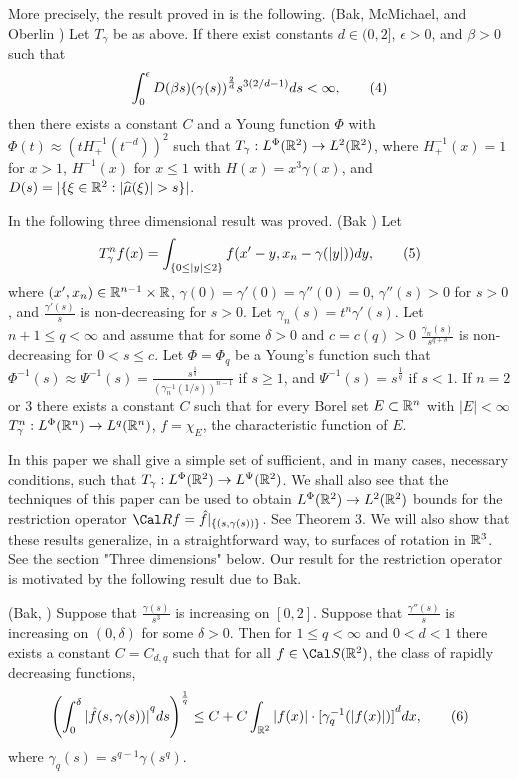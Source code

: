 More precisely, the result proved in \cite{BMO91} is the following. 
 (Bak, McMichael, and Oberlin \cite{BMO91}) Let 
$T_{\gamma}$ be as above. If there exist constants $d \in (0,2]$, 
$\epsilon>0$, and $\beta>0$ such that 
$$ \int_{0}^{\epsilon} D(\beta s) {(\gamma(s))}^{\frac{2}{d}} 
s^{3(2/d-1)} ds<\infty, \tag4$$ then there exists a constant $C$ and 
a Young function $\Phi$ with $\Phi(t) \approx {(tH_{+}^{-1}(t^{-d}))}^2$ 
such that $T_{\gamma}: L^{\Phi}({\Bbb R}^2) \rightarrow L^2({\Bbb R}^2)$,
where $H_{+}^{-1}(x)=1$ for $x>1$, $H^{-1}(x)$ for $x \leq 1$ with 
$H(x)=x^3\gamma(x)$, and $D(s)=|\{ \xi \in {\Bbb R}^2: |\widehat{\mu}(\xi)| 
>s \}|$. \endproclaim 

In \cite{Bak94} the following three dimensional result was proved. 
 (Bak \cite{Bak94}) Let 
$$ T^n_{\gamma}f(x)=\int_{\{0 \leq |y| \leq 2\}} f(x'-y, x_n-\gamma(|y|))dy, 
\tag5$$ where $(x',x_n) \in {\Bbb R}^{n-1} \times {\Bbb R}$,  
$\gamma(0)=\gamma'(0)=\gamma''(0)=0$, $\gamma''(s)>0$ for $s>0$, and 
$\frac{\gamma'(s)}{s}$ is non-decreasing for $s>0$. Let $\gamma_n(s)=t^n
\gamma'(s)$. Let $n+1 \leq q<\infty$ and assume that for some $\delta>0$ and
$c=c(q)>0$ $\frac{\gamma_n(s)}{s^{q+\delta}}$ is non-decreasing for 
$0<s \leq c$. Let $\Phi=\Phi_q$ be a Young's function such that $\Phi^{-1}(s)
\approx \Psi^{-1}(s)=\frac{s^{\frac{1}{q}}}{{(\gamma_n^{-1}(1/s))}^{n-1}}$ 
if $s \ge 1$, and $\Psi^{-1}(s)=s^{\frac{1}{q}}$ if $s<1$. If $n=2$ or $3$ 
there exists a constant $C$ such that for every Borel set $E \subset 
{\Bbb R}^n$ with $|E|<\infty$ $T^n_{\gamma}: L^{\Phi}({\Bbb R}^n) 
\rightarrow L^q({\Bbb R}^n)$, $f=\chi_E$, the characteristic function of $E$.
\endproclaim 

In this paper we shall give a simple set of sufficient, and in many cases,
necessary conditions, such that $T_{\gamma}:L^{\Phi}({\Bbb R}^2) 
\rightarrow L^{\Psi}({\Bbb R}^2)$. We shall also see that the techniques
of this paper can be used to obtain $L^{\Phi}({\Bbb R}^2) \rightarrow 
L^2({\Bbb R}^2)$ bounds for the restriction operator 
${\Cal R}f=\hat{f}{|}_{\{(s, \gamma(s))\}}$. See Theorem 3. 
We will also show that these results generalize, in a 
straightforward way, to surfaces of rotation in ${\Bbb R}^3$. See 
the section "Three dimensions" below. Our result for the restriction 
operator is motivated by the following result due to Bak. 

 (Bak, \cite{Bak94-2}) Suppose
that $\frac{\gamma(s)}{s^3}$ is increasing on $[0,2]$. Suppose that 
$\frac{\gamma''(s)}{s}$ is increasing on $(0,\delta)$ for some $\delta>0$. 
Then for $1 \leq q<\infty$ and $0<d<1$ there exists a constant $C=C_{d,q}$ 
such that for all $f \in {\Cal S}({\Bbb R}^2)$, the class of rapidly decreasing
functions, 
$$ {\left( \int_{0}^{\delta} {|\hat{f}(s, \gamma(s))|}^q ds \right)}^
{\frac{1}{q}} \leq C+C\int_{{\Bbb R}^2} |f(x)| \cdot {[\gamma_q^{-1}(|f(x)|)]}
^d dx, \tag6$$ where $\gamma_q(s)=s^{q-1}\gamma(s^q)$. 
\endproclaim 


